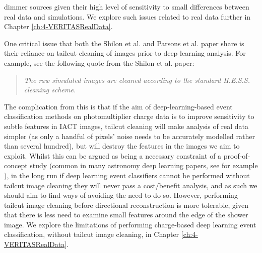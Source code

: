 dimmer sources given their high level of sensitivity to small differences between real data and simulations. We explore such issues related to real data further in Chapter \ref{ch:4-VERITASRealData}.

One critical issue that both the Shilon et al. and Parsons et al. paper share is their reliance on tailcut cleaning of images prior to deep learning analysis. For example, see the following quote from the Shilon et al. paper:
\begin{quote}
    \textit{The raw simulated images are cleaned according to the standard H.E.S.S. cleaning scheme.}
\end{quote}

The complication from this is that if the aim of deep-learning-based event classification methods on photomultiplier charge data is to improve sensitivity to subtle features in IACT images, tailcut cleaning will make analysis of real data simpler (as only a handful of pixels' noise needs to be accurately modelled rather than several hundred), but will destroy the features in the images we aim to exploit. Whilst this can be argued as being a necessary constraint of a proof-of-concept study (common in many astronomy deep learning papers, see for example \cite{dodgygal}), in the long run if deep learning event classifiers cannot be performed without tailcut image cleaning they will never pass a cost/benefit analysis, and as such we should aim to find ways of avoiding the need to do so. However, performing tailcut image cleaning before directional reconstruction is more tolerable, given that there is less need to examine small features around the edge of the shower image. We explore the limitations of performing charge-based deep learning event classification, without tailcut image cleaning, in Chapter \ref{ch:4-VERITASRealData}.  

